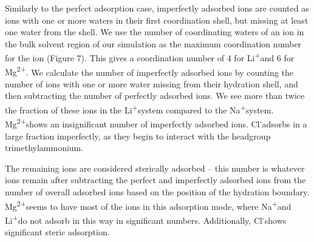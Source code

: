 \documentclass[12pt,openany,final]{book}
\newcommand{\na}{Na\textsuperscript{+}}
\newcommand{\li}{Li\textsuperscript{+}}
\newcommand{\mg}{Mg\textsuperscript{2+}}
\newcommand{\cl}{Cl\textsuperscript{-}}
\begin{document}
Similarly to the perfect adsorption case, imperfectly adsorbed ions are counted as ions with one or more waters in their 
first coordination shell, but missing at least one
water from the shell. {We use the number of coordinating waters of an ion in the bulk solvent region
    of our simulation as the maximum coordination number for the ion (Figure 7). This
gives a coordination number of 4 for \li and 6 for 
Mg\textsuperscript{2+}.} We calculate 
{the number of imperfectly adsorbed ions} by counting the number of ions with 
one or more water missing from their hydration shell, and then subtracting the number of perfectly adsorbed ions.
We see more than twice the fraction of these ions in the \li system compared to the \na system. \mg shows an insignificant
number of imperfectly adsorbed ions. \cl adsorbs in a large fraction imperfectly, as they begin to interact with the headgroup trimethylammonium.

The remaining ions are considered sterically adsorbed -- this number is whatever ions remain after subtracting the 
perfect and imperfectly adsorbed ions from the number of overall adsorbed ions based on the position of the hydration boundary. 
\mg seems to have most of the ions in this adsorption mode, where \na and \li do not 
adsorb in this way in significant numbers. Additionally, \cl shows significant steric adsorption.
\end{document}
